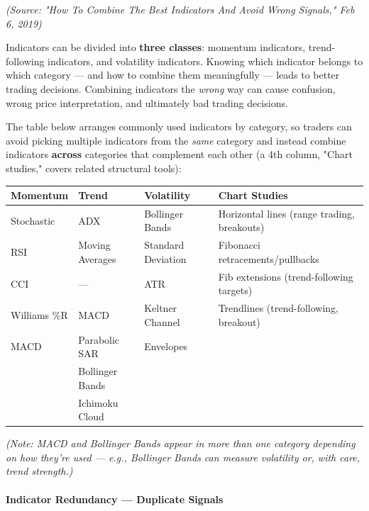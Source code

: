\documentclass[12pt,openany]{book}
\begin{document}
\emph{(Source: "How To Combine The Best Indicators And Avoid Wrong Signals," Feb 6, 2019)}

Indicators can be divided into \textbf{three classes}: momentum indicators, trend-following indicators, and volatility indicators. Knowing which indicator belongs to which category --- and how to combine them meaningfully --- leads to better trading decisions. Combining indicators the \emph{wrong} way can cause confusion, wrong price interpretation, and ultimately bad trading decisions.

The table below arranges commonly used indicators by category, so traders can avoid picking multiple indicators from the \emph{same} category and instead combine indicators \textbf{across} categories that complement each other (a 4th column, "Chart studies," covers related structural tools):

\begin{center}
\scriptsize
\renewcommand{\arraystretch}{1.2}
\begin{tabular}{|L{0.17\textwidth}|L{0.17\textwidth}|L{0.18\textwidth}|L{0.28\textwidth}|}
\hline
 \textbf{Momentum} & \textbf{Trend} & \textbf{Volatility} & \textbf{Chart Studies} \\ \hline
 Stochastic & ADX & Bollinger Bands & Horizontal lines (range trading, breakouts) \\ \hline
 RSI & Moving Averages & Standard Deviation & Fibonacci retracements/pullbacks \\ \hline
 CCI & --- & ATR & Fib extensions (trend-following targets) \\ \hline
 Williams \%R & MACD & Keltner Channel & Trendlines (trend-following, breakout) \\ \hline
 MACD & Parabolic SAR & Envelopes &  \\ \hline
  & Bollinger Bands &  &  \\ \hline
  & Ichimoku Cloud &  &  \\ \hline
\end{tabular}
\end{center}

\emph{(Note: MACD and Bollinger Bands appear in more than one category depending on how they're used --- e.g., Bollinger Bands can measure volatility or, with care, trend strength.)}

\paragraph{Indicator Redundancy --- Duplicate Signals}
\end{document}

